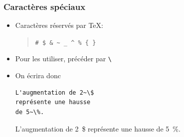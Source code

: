 \begin{frame}[fragile=singleslide]
  \frametitle{Caractères spéciaux}

  \begin{itemize}
  \item Caractères réservés par {\TeX}:
    \begin{quote}
      \verb=# $ & ~ _ ^ % { }=
    \end{quote}
  \item Pour les utiliser, précéder par \verb=\=
  \item On écrira donc
    \begin{demo}
      \begin{texample}
\begin{lstlisting}
L'augmentation de 2~\$
représente une hausse
de 5~\%.
\end{lstlisting}
        \producing
        L'augmentation de 2~\$ représente une
        hausse de 5~\%.
      \end{texample}
    \end{demo}
  \end{itemize}
\end{frame}

